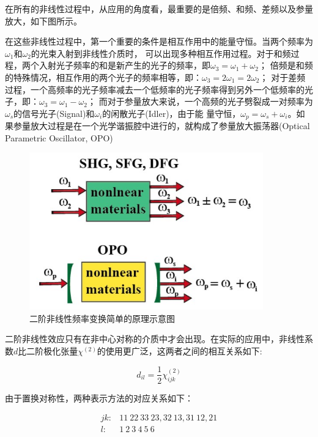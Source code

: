\documentclass[a4paper,UTF8]{ctexart}
\begin{document}
在所有的非线性过程中，从应用的角度看，最重要的是倍频、和频、差频以及参量放大，如下图所示。

在这些非线性过程中，第一个重要的条件是相互作用中的能量守恒。当两个频率为$\omega_1$和$\omega_2$的光束入射到非线性介质时，
可以出现多种相互作用过程。对于和频过程，两个入射光子频率的和是新产生的光子的频率，即$\omega_3 = \omega_1 + \omega_2$；
倍频是和频的特殊情况，相互作用的两个光子的频率相等，即：$\omega_3 = 2\omega_1 = 2\omega_2$；
对于差频过程，一个高频率的光子频率减去一个低频率的光子频率得到另外一个低频率的光子，即：$\omega_3 = \omega_1 - \omega_2$；
而对于参量放大来说，一个高频的光子劈裂成一对频率为$\omega_s$的信号光子(Signal)和$\omega_i$的闲散光子(Idler)，由于能
量守恒，$\omega_p = \omega_s + \omega_i$。如果参量放大过程是在一个光学谐振腔中进行的，就构成了参量放大振荡器(Optical Parametric Oscillator, OPO)


\begin{figure}[H]
    \centering
    \begin{minipage}[b]{0.9\textwidth}
        \centering
        \includegraphics[width=0.9\textwidth]{./fig2.jpg}
        \caption{二阶非线性频率变换简单的原理示意图}
    \end{minipage}
\end{figure}

二阶非线性效应只有在非中心对称的介质中才会出现。在实际的应用中，非线性系数$d$比二阶极化张量$\chi^{(2)}$的使用更广泛，这两者之间的相互关系如下:

\begin{equation}
    d_{il} = \frac{1}{2}\chi^{(2)}_{ijk}
\end{equation}

由于置换对称性，两种表示方法的对应关系如下：

\begin{align}
jk:& 11 \ 22 \ 33 \ 23,32 \ 13,31 \ 12,21 \\
    l:& 1 \ 2 \ 3 \ 4 \ 5 \ 6
\end{align}
\end{document}
